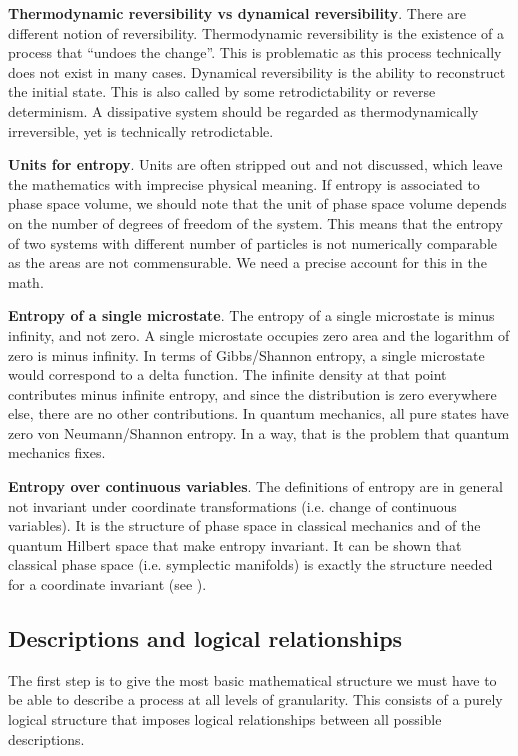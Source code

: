 \documentclass[10pt, onecolumn, longbibliography, nofootinbib]{revtex4-2}
\begin{document}
\textbf{Thermodynamic reversibility vs dynamical reversibility}. There are different notion of reversibility. Thermodynamic reversibility is the existence of a process that ``undoes the change''. This is problematic as this process technically does not exist in many cases. Dynamical reversibility is the ability to reconstruct the initial state. This is also called by some retrodictability or reverse determinism. A dissipative system should be regarded as thermodynamically irreversible, yet is technically retrodictable.

\textbf{Units for entropy}. Units are often stripped out and not discussed, which leave the mathematics with imprecise physical meaning. If entropy is associated to phase space volume, we should note that the unit of phase space volume depends on the number of degrees of freedom of the system. This means that the entropy of two systems with different number of particles is not numerically comparable as the areas are not commensurable. We need a precise account for this in the math.

\textbf{Entropy of a single microstate}. The entropy of a single microstate is minus infinity, and not zero. A single microstate occupies zero area and the logarithm of zero is minus infinity. In terms of Gibbs/Shannon entropy, a single microstate would correspond to a delta function. The infinite density at that point contributes minus infinite entropy, and since the distribution is zero everywhere else, there are no other contributions. In quantum mechanics, all pure states have zero von Neumann/Shannon entropy. In a way, that is the problem that quantum mechanics fixes.

\textbf{Entropy over continuous variables}. The definitions of entropy are in general not invariant under coordinate transformations (i.e. change of continuous variables). It is the structure of phase space in classical mechanics and of the quantum Hilbert space that make entropy invariant. It can be shown that classical phase space (i.e. symplectic manifolds) is exactly the structure needed for a coordinate invariant (see \cite{aop-phil-Hamiltonianinformation}).


\subsection{Descriptions and logical relationships}

The first step is to give the most basic mathematical structure we must have to be able to describe a process at all levels of granularity. This consists of a purely logical structure that imposes logical relationships between all possible descriptions.
\end{document}
